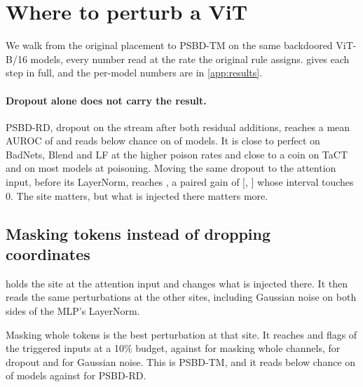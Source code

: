 \section{Where to perturb a ViT}
\label{sec:results}

We walk from the original placement to PSBD-TM on the same backdoored ViT-B/16 models, every number read at the rate the original rule assigns.  gives each step in full, and the per-model numbers are in \cref{app:results}.

\paragraph{Dropout alone does not carry the result.}
PSBD-RD, dropout on the stream after both residual additions, reaches a mean AUROC of \StaircaseResidualPostResidualAuroc{} and reads below chance on \StaircaseResidualPostResidualBelowChance{} of \StaircaseResidualPostResidualN{} models. It is close to perfect on BadNets, Blend and LF at the higher poison rates and close to a coin on TaCT and on most models at \PanelRateLow{} poisoning. Moving the same dropout to the attention input, before its LayerNorm, reaches \StaircaseDropoutSitesBeforeAttentionNormAuroc{}, a paired gain of \StaircaseDropoutSitesBeforeAttentionNormGain{} [\StaircaseDropoutSitesBeforeAttentionNormGainLow{}, \StaircaseDropoutSitesBeforeAttentionNormGainHigh{}] whose interval touches 0. The site matters, but what is injected there matters more.

\subsection{Masking tokens instead of dropping coordinates}
\label{sec:results:operator}

 holds the site at the attention input and changes what is injected there. It then reads the same perturbations at the other sites, including Gaussian noise on both sides of the MLP's LayerNorm.



Masking whole tokens is the best perturbation at that site. It reaches \StaircaseOperatorsBeforeAttentionNormTokenMaskAuroc{} and flags \StaircaseOperatorsBeforeAttentionNormTokenMaskTprAtOneZeroPercent{} of the triggered inputs at a 10\% budget, against \StaircaseOperatorsBeforeAttentionNormChannelMaskAuroc{} for masking whole channels, \StaircaseOperatorsBeforeAttentionNormAuroc{} for dropout and \StaircaseOperatorsBeforeAttentionNormGaussianAuroc{} for Gaussian noise. This is PSBD-TM, and it reads below chance on \StaircaseOperatorsBeforeAttentionNormTokenMaskBelowChance{} of \StaircaseOperatorsBeforeAttentionNormTokenMaskN{} models against \StaircaseOperatorsPostResidualBelowChance{} for PSBD-RD.


